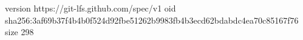 version https://git-lfs.github.com/spec/v1
oid sha256:3af69b37f4b4b0f524d92fbe51262b9983fb4b3ecd62bdabdc4ea70c85167f76
size 298
